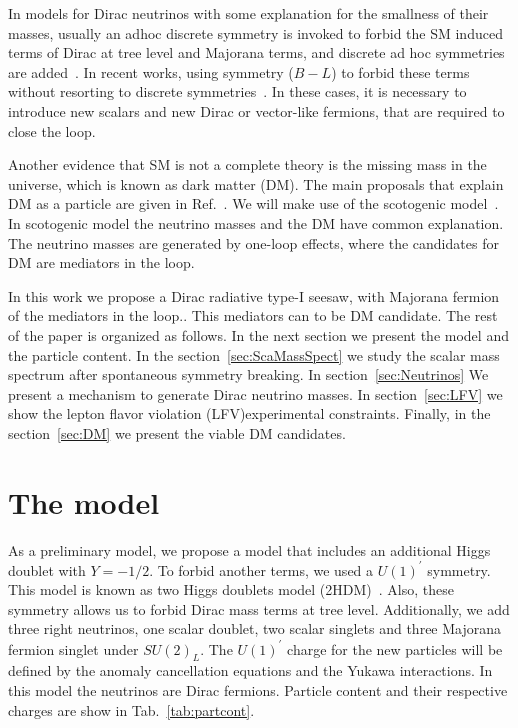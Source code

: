 \documentclass[12pt]{article}
\begin{document}
In models for Dirac neutrinos with some explanation for the smallness of
their masses, usually an adhoc discrete symmetry is invoked to forbid
the SM induced terms of Dirac at tree level and Majorana terms,
and discrete ad hoc symmetries are added~\cite{Han:2018zcn, Wang:2017mcy}.
In recent works, using symmetry ($B-L$) to forbid these terms without resorting
to discrete symmetries~\cite{Calle:2018ovc, Bonilla:2018ynb, Saad:2019bqf}.
In these cases, it is necessary to introduce new scalars and new Dirac or 
vector-like fermions, that are required to close the loop.

Another evidence that SM is not a complete theory is the missing mass in the universe, which is known as dark matter (DM). The main proposals that explain DM as a particle are given in Ref.~\cite{Bertone:2004pz}. We will make use of the scotogenic model~\cite{Ma:2006km}. In scotogenic model the neutrino masses and the DM have common explanation. The neutrino masses are generated by one-loop effects, where the candidates for DM are mediators in the loop.

In this work we propose a Dirac radiative type-I seesaw,
with Majorana fermion of the mediators in the loop.. This mediators can to be DM candidate. The rest of the paper is organized as follows. In the next section we present the model and the particle content. In the section~\ref{sec:ScaMassSpect} we study the scalar mass spectrum after spontaneous symmetry breaking. In section~\ref{sec:Neutrinos} We present a mechanism to generate Dirac neutrino masses. In section~\ref{sec:LFV} we show the lepton flavor violation (LFV)experimental  constraints. Finally, in the section~\ref{sec:DM} we present the viable DM candidates.

\section{The model}
\label{sec:Model}
As a preliminary model, we propose a model that includes an additional Higgs doublet with $ Y = -1/2 $. To forbid another terms, we used a $U(1)^{\prime}$ symmetry. This model is known as two Higgs doublets model (2HDM)~\cite{Davidson:2005cw}. Also, these symmetry allows us to forbid Dirac mass terms at tree level. Additionally, we add three right neutrinos, one scalar doublet, two scalar singlets and three Majorana fermion singlet under $SU(2)_L$. The $U(1)^{\prime}$ charge for the new particles will be defined by the anomaly cancellation equations and the Yukawa interactions. In this model the neutrinos are Dirac fermions. Particle content and their respective charges are show in Tab.~\ref{tab:partcont}. 
\end{document}
